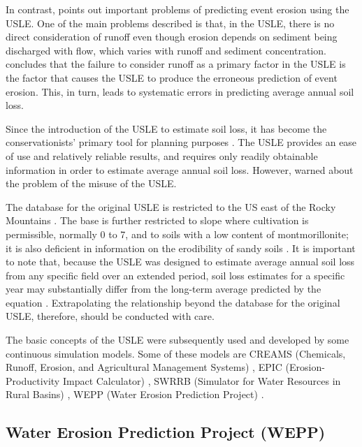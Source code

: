 In contrast, \citet{kinnell2005-851} points out important problems of predicting
event erosion using the USLE. One of the main problems described is that, in the
USLE, there is no direct consideration of runoff even though erosion depends on
sediment being discharged with flow, which varies with runoff and sediment
concentration. \citet{kinnell2005-851} concludes that the failure to consider
runoff as a primary factor in the USLE is the factor that causes the USLE to
produce the erroneous prediction of event erosion. This, in turn, leads to
systematic errors in predicting average annual soil loss.

Since the introduction of the USLE to estimate soil loss, it has become the
conservationists' primary tool for planning purposes
\citep{diaz1987-189,centeri2002-211}. The USLE provides an ease of use and
relatively reliable results, and requires only readily obtainable information in
order to estimate average annual soil loss. However,
\citet{wischmeier1976-misuse} warned about the problem of the misuse of the
USLE.

The database for the original USLE is restricted to the US east of the Rocky
Mountains \citep{wischmeier1978-537}. The base is further restricted to slope
where cultivation is permissible, normally 0 to 7\textdegree, and to soils with
a low content of montmorillonite; it is also deficient in information on the
erodibility of sandy soils \citep{wischmeier1978-537}. It is important to note
that, because the USLE was designed to estimate average annual soil loss from
any specific field over an extended period, soil loss estimates for a specific
year may substantially differ from the long-term average predicted by the
equation \citep{wischmeier1976-misuse}. Extrapolating the relationship beyond
the database for the original USLE, therefore, should be conducted with care.

The basic concepts of the USLE were subsequently used and developed by some
continuous simulation models. Some of these models are CREAMS (Chemicals,
Runoff, Erosion, and Agricultural Management Systems) \citep{knisel1980-creams},
EPIC (Erosion-Productivity Impact Calculator) \citep{williams1984-129}, SWRRB
(Simulator for Water Resources in Rural Basins) \citep{williams1985-970}, WEPP
(Water Erosion Prediction Project) \citep{nearing1989-1587, flanagan1995-usda}.

\subsection{Water Erosion Prediction Project (WEPP)}
\label{sec:WaterErosionPredictionProjectWEPP}

